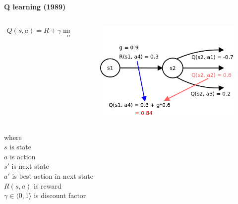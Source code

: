 \documentclass[xcolor=dvipsnames]{beamer}
\begin{document}
\begin{frame}{\bf Q learning (1989)}

\begin{columns}
\begin{column}{0.5\textwidth}

  \begin{align*}
  Q(s, a) = R + \gamma \max \limits_{\alpha'} Q(s', \alpha')
  \end{align*}

\end{column}
\begin{column}{0.5\textwidth}  %


  \begin{figure}[!htb]
    \centering
    \includegraphics[scale=0.2]{../../diagrams/q_learning_detail.png}
  \end{figure}

\end{column}
\end{columns}



where \\
$s$ is state \\
$a$ is action \\
$s'$ is next state \\
$a'$ is best action in next state \\
$R(s, a)$ is reward \\
$\gamma \in \langle 0, 1 \rangle$ is discount factor \\


\end{frame}
\end{document}
